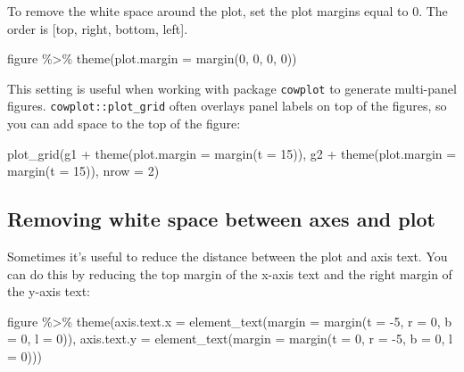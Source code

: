 \documentclass[
]{book}
\newenvironment{Shaded}{\begin{snugshade}}{\end{snugshade}}
\newcommand{\AttributeTok}[1]{\textcolor[rgb]{0.77,0.63,0.00}{#1}}
\newcommand{\DecValTok}[1]{\textcolor[rgb]{0.00,0.00,0.81}{#1}}
\newcommand{\FunctionTok}[1]{\textcolor[rgb]{0.00,0.00,0.00}{#1}}
\newcommand{\NormalTok}[1]{#1}
\newcommand{\SpecialCharTok}[1]{\textcolor[rgb]{0.00,0.00,0.00}{#1}}
\begin{document}
To remove the white space around the plot, set the plot margins equal to 0. The order is {[}top, right, bottom, left{]}.

\begin{Shaded}
\begin{Highlighting}[]
\NormalTok{figure }\SpecialCharTok{\%\textgreater{}\%} 
  \FunctionTok{theme}\NormalTok{(}\AttributeTok{plot.margin =} \FunctionTok{margin}\NormalTok{(}\DecValTok{0}\NormalTok{, }\DecValTok{0}\NormalTok{, }\DecValTok{0}\NormalTok{, }\DecValTok{0}\NormalTok{))}
\end{Highlighting}
\end{Shaded}

This setting is useful when working with package \texttt{cowplot} to generate multi-panel figures. \texttt{cowplot::plot\_grid} often overlays panel labels on top of the figures, so you can add space to the top of the figure:

\begin{Shaded}
\begin{Highlighting}[]
\FunctionTok{plot\_grid}\NormalTok{(g1 }\SpecialCharTok{+} \FunctionTok{theme}\NormalTok{(}\AttributeTok{plot.margin =} \FunctionTok{margin}\NormalTok{(}\AttributeTok{t =} \DecValTok{15}\NormalTok{)),}
\NormalTok{          g2 }\SpecialCharTok{+} \FunctionTok{theme}\NormalTok{(}\AttributeTok{plot.margin =} \FunctionTok{margin}\NormalTok{(}\AttributeTok{t =} \DecValTok{15}\NormalTok{)),}
          \AttributeTok{nrow =} \DecValTok{2}\NormalTok{)}
\end{Highlighting}
\end{Shaded}

\hypertarget{removing-white-space-between-axes-and-plot}{%
\subsection{Removing white space between axes and plot}\label{removing-white-space-between-axes-and-plot}}

Sometimes it's useful to reduce the distance between the plot and axis text. You can do this by reducing the top margin of the x-axis text and the right margin of the y-axis text:

\begin{Shaded}
\begin{Highlighting}[]
\NormalTok{figure }\SpecialCharTok{\%\textgreater{}\%} 
  \FunctionTok{theme}\NormalTok{(}\AttributeTok{axis.text.x =} \FunctionTok{element\_text}\NormalTok{(}\AttributeTok{margin =} \FunctionTok{margin}\NormalTok{(}\AttributeTok{t =} \SpecialCharTok{{-}}\DecValTok{5}\NormalTok{, }\AttributeTok{r =} \DecValTok{0}\NormalTok{, }\AttributeTok{b =} \DecValTok{0}\NormalTok{, }\AttributeTok{l =} \DecValTok{0}\NormalTok{)),}
        \AttributeTok{axis.text.y =} \FunctionTok{element\_text}\NormalTok{(}\AttributeTok{margin =} \FunctionTok{margin}\NormalTok{(}\AttributeTok{t =} \DecValTok{0}\NormalTok{, }\AttributeTok{r =} \SpecialCharTok{{-}}\DecValTok{5}\NormalTok{, }\AttributeTok{b =} \DecValTok{0}\NormalTok{, }\AttributeTok{l =} \DecValTok{0}\NormalTok{)))}
\end{Highlighting}
\end{Shaded}
\end{document}
